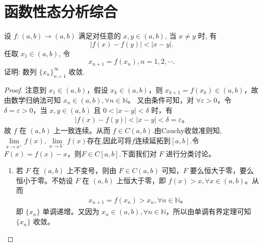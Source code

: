 \documentclass[../../main.tex]{subfiles}%
\begin{document}
\section{函数性态分析综合}

\begin{proposition}
设 $f : (a, b) \to (a, b)$ 满足对任意的 $x, y \in (a, b)$, 当 $x \neq y$ 时, 有 
$$
\left| f(x) - f(y) \right| < \left| x - y \right|.
$$ 
任取 $x_1 \in (a, b)$, 令 $$
x_{n+1} = f(x_n), n = 1, 2, \cdots.
$$
证明: 数列 $\{x_n\}_{n=1}^{\infty}$ 收敛.
\end{proposition}
\begin{proof}
注意到 $x_1 \in (a, b)$，假设 $x_k \in (a, b)$，则 $x_{k+1} = f(x_k) \in (a, b)$，故由数学归纳法可知 $x_n \in (a, b), \forall n \in \mathbb{N}$。
又由条件可知，对 $\forall \varepsilon > 0$，令 $\delta = \varepsilon > 0$，当 $x, y \in (a, b)$ 且 $0 < |x - y| < \delta$ 时，有
\begin{align*}
|f(x) - f(y)| < |x - y| < \delta = \varepsilon。
\end{align*}
故 $f$ 在 $(a, b)$ 上一致连续。从而 $f \in C(a, b)$.由Cauchy收敛准则知,$\underset{x\rightarrow a^+}{\lim}f\left( x \right) ,\underset{x\rightarrow b^-}{\lim}f\left( x \right) $存在,因此可将$f$连续延拓到$[a,b]$.令 $F(x) = f(x) - x$，则$F \in C[a, b]$.下面我们对 $F$ 进行分类讨论。

\begin{enumerate}[(1)]
\item 若 $F$ 在 $(a, b)$ 上不变号，则由 $F \in C(a, b)$ 可知，$F$ 要么恒大于零，要么恒小于零。不妨设 $F$ 在 $(a, b)$ 上恒大于零，即 $f(x) > x, \forall x \in (a, b)$。从而
\begin{align*}
x_{n+1} = f(x_n) > x_n, \forall n \in \mathbb{N}。
\end{align*}
即 $\{x_n\}$ 单调递增。又因为 $x_n \in (a, b), \forall n \in \mathbb{N}$，所以由单调有界定理可知 $\{x_n\}$ 收敛。


\end{enumerate}
\end{proof}
\end{document}
